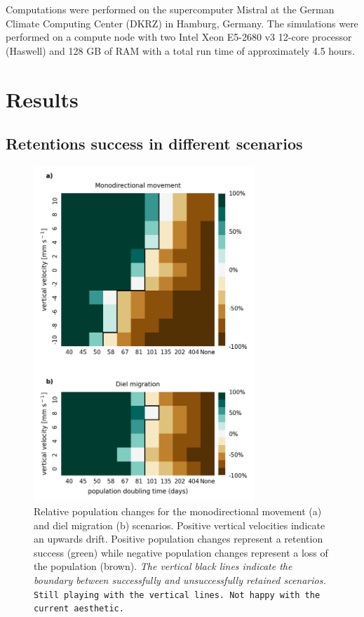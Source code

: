 \documentclass[npg, manuscript]{copernicus}
\begin{document}
Computations were performed on the supercomputer Mistral at the German Climate Computing Center (DKRZ) in Hamburg, Germany.
The simulations were performed on a compute node with two  Intel Xeon E5-2680 v3 12-core processor (Haswell) and 128 GB of RAM with a total run time of approximately 4.5 hours.

\section{Results}

\subsection{Retentions success in different scenarios}

\begin{figure}
    \includegraphics[width=8.3cm]{retention_success_combined.png}
    \caption[]{
        Relative population changes for the monodirectional movement (a) and diel migration (b) scenarios. Positive vertical velocities indicate an upwards drift. Positive population changes represent a retention success (green) while negative population changes represent a loss of the population (brown). 
        \textit{
            The vertical black lines indicate the boundary between successfully and unsuccessfully retained scenarios.
        }
        \texttt{
            Still playing with the vertical lines. Not happy with the current aesthetic.
        }
    }
    \label{fig:retention_success}
\end{figure}
\end{document}
